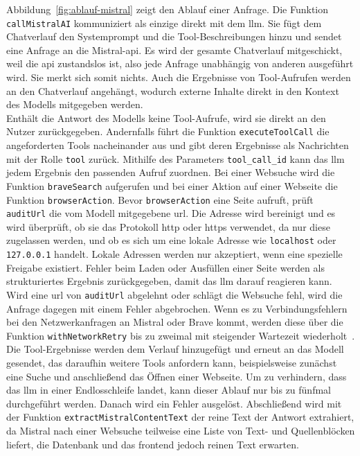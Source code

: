 Abbildung~\ref{fig:ablauf-mistral} zeigt den Ablauf einer Anfrage. Die Funktion \texttt{callMistralAI} kommuniziert als einzige direkt mit dem \ac{llm}. 
Sie fügt dem Chatverlauf den Systemprompt und die Tool-Beschreibungen hinzu und sendet eine Anfrage an die Mistral-\ac{api}. Es wird der gesamte Chatverlauf
mitgeschickt, weil die \ac{api} zustandslos ist, also jede Anfrage unabhängig von anderen ausgeführt wird. Sie merkt sich somit nichts. Auch die Ergebnisse
von Tool-Aufrufen werden an den Chatverlauf angehängt, wodurch externe Inhalte direkt in den Kontext des Modells mitgegeben werden.  \\
Enthält die Antwort des Modells keine Tool-Aufrufe, wird sie direkt an den Nutzer zurückgegeben. Andernfalls führt die Funktion \texttt{executeToolCall} die 
angeforderten Tools nacheinander aus und gibt deren Ergebnisse als Nachrichten mit der Rolle \texttt{tool} zurück. Mithilfe des Parameters \texttt{tool\_call\_id}
kann das \ac{llm} jedem Ergebnis den passenden Aufruf zuordnen. Bei einer Websuche wird die Funktion \texttt{braveSearch} aufgerufen und bei einer Aktion auf 
einer Webseite die Funktion \texttt{browserAction}. Bevor \texttt{browserAction} eine Seite aufruft, prüft \texttt{auditUrl} die vom Modell mitgegebene \ac{url}. 
Die Adresse wird bereinigt und es wird überprüft, ob sie das Protokoll \ac{http} oder \ac{https} verwendet, da nur diese zugelassen werden, und ob es sich um eine lokale Adresse wie 
\texttt{localhost} oder \texttt{127.0.0.1} handelt. Lokale Adressen werden nur akzeptiert, wenn eine spezielle Freigabe existiert. Fehler beim Laden oder Ausfüllen
einer Seite werden als strukturiertes Ergebnis zurückgegeben, damit das \ac{llm} darauf reagieren kann. Wird eine
\ac{url} von \texttt{auditUrl} abgelehnt oder schlägt die Websuche fehl, wird die Anfrage dagegen mit einem Fehler abgebrochen.
Wenn es zu Verbindungsfehlern bei den Netzwerkanfragen an Mistral oder
Brave kommt, werden diese über die Funktion \texttt{withNetworkRetry} bis zu zweimal mit steigender Wartezeit wiederholt~\cite{an16}. \\
Die Tool-Ergebnisse werden dem Verlauf hinzugefügt und erneut an das Modell gesendet, das daraufhin weitere Tools anfordern kann, beispielsweise zunächst eine Suche und
anschließend das Öffnen einer Webseite. Um zu verhindern, dass das \ac{llm} in einer Endlosschleife landet, kann dieser Ablauf nur bis zu fünfmal durchgeführt
werden. Danach wird ein Fehler ausgelöst. Abschließend wird mit der Funktion \texttt{extractMistralContentText} der reine Text der Antwort extrahiert, da Mistral
nach einer Websuche teilweise eine Liste von Text- und Quellenblöcken liefert, die Datenbank und das \gls{frontend} jedoch reinen Text erwarten.

